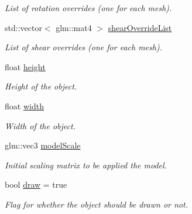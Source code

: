\begin{DoxyCompactItemize}
\begin{DoxyCompactList}\small\item\em List of rotation overrides (one for each mesh). \end{DoxyCompactList}\item 
std\+::vector$<$ glm\+::mat4 $>$ \hyperlink{class_obj_a424c94c66d586640bd88cf19c031c756}{shear\+Override\+List}\hypertarget{class_obj_a424c94c66d586640bd88cf19c031c756}{}\label{class_obj_a424c94c66d586640bd88cf19c031c756}

\begin{DoxyCompactList}\small\item\em List of shear overrides (one for each mesh). \end{DoxyCompactList}\item 
float \hyperlink{class_obj_ae3f4e1cecebf1ac2c5706fe4ddc3cd5b}{height}\hypertarget{class_obj_ae3f4e1cecebf1ac2c5706fe4ddc3cd5b}{}\label{class_obj_ae3f4e1cecebf1ac2c5706fe4ddc3cd5b}

\begin{DoxyCompactList}\small\item\em Height of the object. \end{DoxyCompactList}\item 
float \hyperlink{class_obj_ae91c4644ff64eb08a2d18dc1a9bbd315}{width}\hypertarget{class_obj_ae91c4644ff64eb08a2d18dc1a9bbd315}{}\label{class_obj_ae91c4644ff64eb08a2d18dc1a9bbd315}

\begin{DoxyCompactList}\small\item\em Width of the object. \end{DoxyCompactList}\item 
glm\+::vec3 \hyperlink{class_obj_af20f949768dcdb4ee23c63ac02563786}{model\+Scale}\hypertarget{class_obj_af20f949768dcdb4ee23c63ac02563786}{}\label{class_obj_af20f949768dcdb4ee23c63ac02563786}

\begin{DoxyCompactList}\small\item\em Initial scaling matrix to be applied the model. \end{DoxyCompactList}\item 
bool \hyperlink{class_obj_adf0f7b5c8ca61c7cfee46c832288fa19}{draw} = true\hypertarget{class_obj_adf0f7b5c8ca61c7cfee46c832288fa19}{}\label{class_obj_adf0f7b5c8ca61c7cfee46c832288fa19}

\begin{DoxyCompactList}\small\item\em Flag for whether the object should be drawn or not. \end{DoxyCompactList}\end{DoxyCompactItemize}
